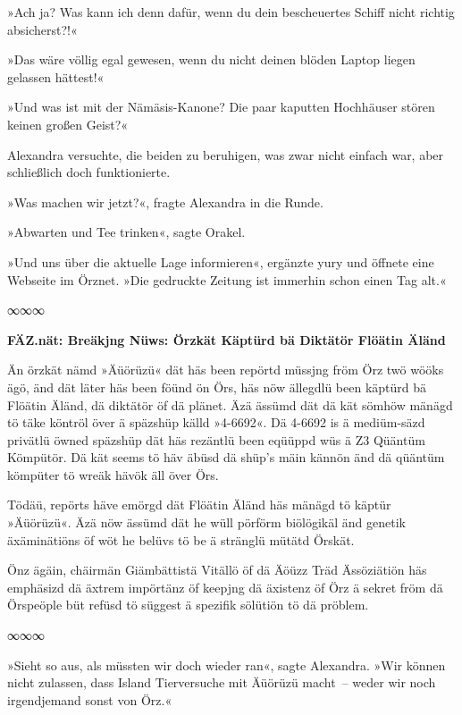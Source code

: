 »Ach ja? Was kann ich denn dafür, wenn du dein bescheuertes Schiff nicht richtig absicherst?!«

»Das wäre völlig egal gewesen, wenn du nicht deinen blöden Laptop liegen gelassen hättest!«

»Und was ist mit der Nämäsis-Kanone? Die paar kaputten Hochhäuser stören keinen großen Geist?«

Alexandra versuchte, die beiden zu beruhigen, was zwar nicht einfach war, aber schließlich doch funktionierte.

»Was machen wir jetzt?«, fragte Alexandra in die Runde.

»Abwarten und Tee trinken«, sagte Orakel.

»Und uns über die aktuelle Lage informieren«, ergänzte yury und öffnete eine Webseite im Örznet. »Die gedruckte Zeitung ist immerhin schon einen Tag alt.«

\begin{center}
    ∞∞∞
\end{center}

    \begin{itshape}

\textbf{FÄZ.nät: Breäkjng Nüws: Örzkät Käptürd bä Diktätör Flöätin Äländ}

Än örzkät nämd »Äüörüzü« dät häs been repörtd müssjng fröm Örz twö wööks ägö, änd dät läter häs been föünd ön Örs, häs nöw ällegdlü been käptürd bä Flöätin Äländ, dä diktätör öf dä plänet. Äzä ässümd dät dä kät sömhöw mänägd tö täke köntröl över ä späzshüp källd »4-6692«. Dä 4-6692 is ä mediüm-säzd privätlü öwned späzshüp dät häs rezäntlü been eqüüppd wüs ä Z3 Qüäntüm Kömpütör. Dä kät seems tö häv äbüsd dä shüp’s mäin kännön änd dä qüäntüm kömpüter tö wreäk hävök äll över Örs.

Tödäü, repörts häve emörgd dät Flöätin Äländ häs mänägd tö käptür »Äüörüzü«. Äzä nöw ässümd dät he wüll pörförm biölögikäl änd genetik äxäminätiöns öf wöt he belüvs tö be ä stränglü mütätd Örskät.

Önz ägäin, chäirmän Giämbättistä Vitällö öf dä Äöüzz Träd Ässöziätiön häs emphäsizd dä äxtrem impörtänz öf keepjng dä äxistenz öf Örz ä sekret fröm dä Örspeöple büt refüsd tö süggest ä spezifik sölütiön tö dä pröblem.

    \end{itshape}

\begin{center}
    ∞∞∞
\end{center}

»Sieht so aus, als müssten wir doch wieder ran«, sagte Alexandra. »Wir können nicht zulassen, dass Island Tierversuche mit Äüörüzü macht~– weder wir noch irgendjemand sonst von Örz.«

